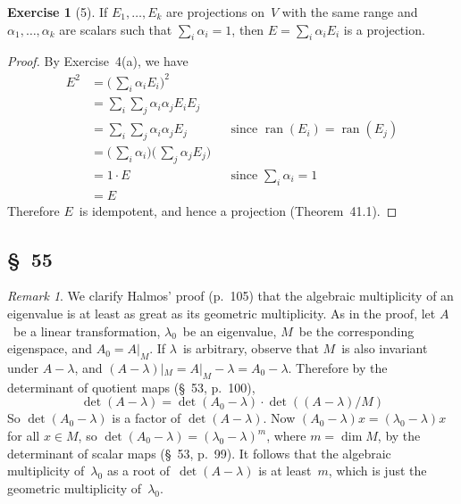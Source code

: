 \documentclass[letterpaper,12pt]{article}
\DeclareMathOperator{\ran}{ran}
\newcommand{\restrict}[2]{{#1}|_{#2}}
\theoremstyle{definition}
\newtheorem*{exer}{Exercise}
\theoremstyle{remark}
\newtheorem*{rmk}{Remark}
\theoremstyle{direction}
\begin{document}
\begin{exer}[5]
If \(E_1,\ldots,E_k\) are projections on~\(V\) with the same range and \(\alpha_1,\ldots,\alpha_k\) are scalars such that \(\sum_i\alpha_i=1\), then \(E=\sum_i\alpha_i E_i\) is a projection.
\end{exer}
\begin{proof}
By Exercise~4(a), we have
\begin{align*}
E^2&=\bigl(\,\sum_i\alpha_iE_i\bigr)^2&&\\
	&=\sum_i\sum_j\alpha_i\alpha_j E_iE_j&&\\
	&=\sum_i\sum_j\alpha_i\alpha_j E_j&&\text{since \(\ran(E_i)=\ran(E_j)\)}\\
	&=\bigl(\,\sum_i\alpha_i\bigr)\bigl(\,\sum_j\alpha_jE_j\bigr)&&\\
	&=1\cdot E&&\text{since \(\textstyle\sum_i\alpha_i=1\)}\\
	&=E
\end{align*}
Therefore \(E\)~is idempotent, and hence a projection (Theorem~41.1).
\end{proof}

\subsection*{\S~55}
\begin{rmk}
We clarify Halmos' proof (p.~105) that the algebraic multiplicity of an eigenvalue is at least as great as its geometric multiplicity. As in the proof, let \(A\)~be a linear transformation, \(\lambda_0\)~be an eigenvalue, \(M\)~be the corresponding eigenspace, and \(A_0=\restrict{A}{M}\). If \(\lambda\)~is arbitrary, observe that \(M\)~is also invariant under \(A-\lambda\), and \(\restrict{(A-\lambda)}{M}=\restrict{A}{M}-\lambda=A_0-\lambda\). Therefore by the determinant of quotient maps (\S~53, p.~100),
\[\det(A-\lambda)=\det(A_0-\lambda)\cdot\det((A-\lambda)/M)\]
So \(\det(A_0-\lambda)\) is a factor of \(\det(A-\lambda)\). Now \((A_0-\lambda)x=(\lambda_0-\lambda)x\) for all \(x\in M\), so \(\det(A_0-\lambda)=(\lambda_0-\lambda)^m\), where \(m=\dim M\), by the determinant of scalar maps (\S~53, p.~99). It follows that the algebraic multiplicity of~\(\lambda_0\) as a root of~\(\det(A-\lambda)\) is at least~\(m\), which is just the geometric multiplicity of~\(\lambda_0\).
\end{rmk}

\end{document}
